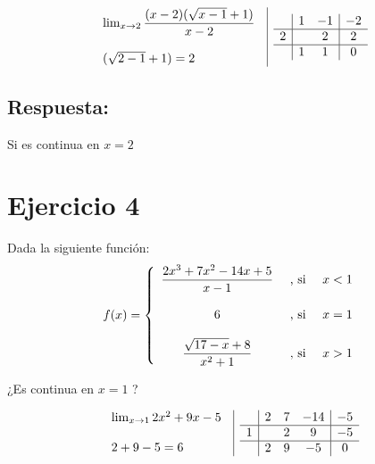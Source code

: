 \documentclass[12pt]{article}
\begin{document}
\vspace{1cm}

\[
\begin{array}{l|c}
  \begin{array}{l}
    \lim_{x \to 2} \dfrac{(x-2) (\sqrt{x - 1} + 1)}{x-2}\\\\
    (\sqrt{2 - 1} + 1) = 2
  \end{array}
  &
  \begin{array}{c|c c|c}
    & 1 & -1 & -2 \\
    \hline
    2 &  & 2 & 2 \\
    \hline
    & 1 & 1 & 0 \\
  \end{array}
\end{array}
\]

\subsection*{Respuesta:} \noindent Si es continua en $x=2$





\newpage
\section*{Ejercicio 4}
\noindent Dada la siguiente función:
\[
f(x) = 
\left\{
  \begin{array}{c l l}
    \dfrac{2x^3 + 7x^2 - 14x + 5}{x-1} & \text{ , si } & x < 1 \\\\
    6 & \text{ , si } & x = 1 \\\\
    \dfrac{\sqrt{17 - x} + 8}{x^2 + 1} & \text{ , si } & x > 1
  \end{array}
\right.
\]

\noindent ¿Es continua en $x=1$ ?

\[
\begin{array}{l|c}
  \begin{array}{l}
    \lim_{x \to 1} 2x^2 + 9x - 5 \\\\
    2 + 9 - 5 = 6 
  \end{array}
  &
  \begin{array}{c|c c c|c}
    & 2 & 7 & -14 & -5 \\
    \hline
    1 &  & 2 & 9 & -5 \\
    \hline
    & 2 & 9 & -5 & 0 \\
  \end{array}
\end{array}
\]
\end{document}
